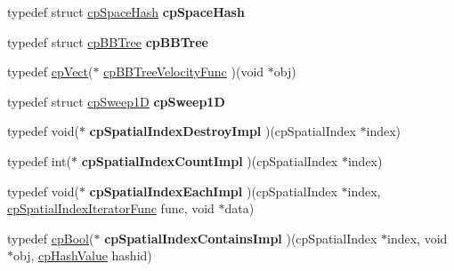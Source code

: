 \begin{DoxyCompactItemize}
\item 
\hypertarget{group__cp_spatial_index_ga3ff6ff3229f67d50c8a936fce831e047}{typedef struct \hyperlink{structcp_space_hash}{cp\-Space\-Hash} {\bfseries cp\-Space\-Hash}}\label{group__cp_spatial_index_ga3ff6ff3229f67d50c8a936fce831e047}

\item 
\hypertarget{group__cp_spatial_index_ga8347b442aab8cc34989d11220846260a}{typedef struct \hyperlink{structcp_b_b_tree}{cp\-B\-B\-Tree} {\bfseries cp\-B\-B\-Tree}}\label{group__cp_spatial_index_ga8347b442aab8cc34989d11220846260a}

\item 
typedef \hyperlink{structcp_vect}{cp\-Vect}($\ast$ \hyperlink{group__cp_spatial_index_gaa256addb4f65c6846dfc306ef62a3988}{cp\-B\-B\-Tree\-Velocity\-Func} )(void $\ast$obj)
\item 
\hypertarget{group__cp_spatial_index_gad24eda1cd6772ea93a036c766b787c3b}{typedef struct \hyperlink{structcp_sweep1_d}{cp\-Sweep1\-D} {\bfseries cp\-Sweep1\-D}}\label{group__cp_spatial_index_gad24eda1cd6772ea93a036c766b787c3b}

\item 
\hypertarget{group__cp_spatial_index_ga90d4fed6e1c4be4a13958097ee719353}{typedef void($\ast$ {\bfseries cp\-Spatial\-Index\-Destroy\-Impl} )(cp\-Spatial\-Index $\ast$index)}\label{group__cp_spatial_index_ga90d4fed6e1c4be4a13958097ee719353}

\item 
\hypertarget{group__cp_spatial_index_ga48e261ad655992edca3434477a8ca89b}{typedef int($\ast$ {\bfseries cp\-Spatial\-Index\-Count\-Impl} )(cp\-Spatial\-Index $\ast$index)}\label{group__cp_spatial_index_ga48e261ad655992edca3434477a8ca89b}

\item 
\hypertarget{group__cp_spatial_index_ga576abea70fb22fe5f63d426a44251036}{typedef void($\ast$ {\bfseries cp\-Spatial\-Index\-Each\-Impl} )(cp\-Spatial\-Index $\ast$index, \hyperlink{group__cp_spatial_index_gaf46e9eeecddefacab2be48aadd5d1a1d}{cp\-Spatial\-Index\-Iterator\-Func} func, void $\ast$data)}\label{group__cp_spatial_index_ga576abea70fb22fe5f63d426a44251036}

\item 
\hypertarget{group__cp_spatial_index_ga24010c4baa0b1c7ed229de0b6a630c15}{typedef \hyperlink{group__basic_types_gab6e5d8afee598a57cd323abae5310244}{cp\-Bool}($\ast$ {\bfseries cp\-Spatial\-Index\-Contains\-Impl} )(cp\-Spatial\-Index $\ast$index, void $\ast$obj, \hyperlink{group__basic_types_gae7eb4775a9f43914a15553ca65a048f4}{cp\-Hash\-Value} hashid)}\label{group__cp_spatial_index_ga24010c4baa0b1c7ed229de0b6a630c15}


\end{DoxyCompactItemize}

